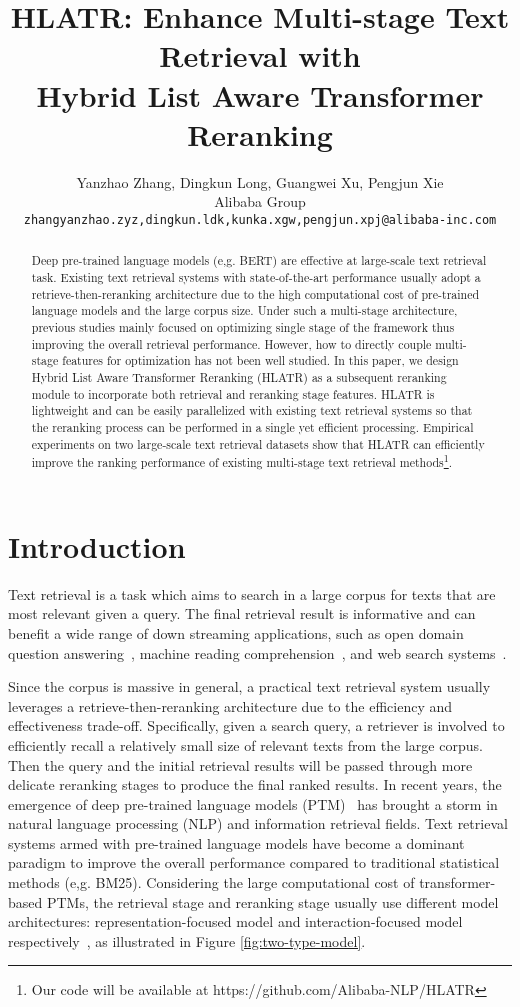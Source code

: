 \documentclass[11pt]{article}
\title{HLATR: Enhance Multi-stage Text Retrieval with \\ Hybrid List Aware Transformer Reranking}
\author{Yanzhao Zhang, Dingkun Long, Guangwei Xu, Pengjun Xie \\
  Alibaba Group \\
  \texttt{zhangyanzhao.zyz,dingkun.ldk,kunka.xgw,pengjun.xpj@alibaba-inc.com} \\
}
\begin{document}
\maketitle
\begin{abstract}
Deep pre-trained language models (e,g. BERT) are effective at large-scale text retrieval task. Existing text retrieval systems with state-of-the-art performance usually adopt a retrieve-then-reranking architecture due to the high computational cost of pre-trained language models and the large corpus size. Under such a multi-stage architecture, previous studies mainly focused on optimizing single stage of the framework thus improving the overall retrieval performance. However, how to directly couple multi-stage features for optimization has not been well studied. In this paper, we design Hybrid List Aware Transformer Reranking (HLATR) as a subsequent reranking module to incorporate both retrieval and reranking stage features. HLATR is lightweight and can be easily parallelized with existing text retrieval systems so that the reranking process can be performed in a single yet efficient processing. Empirical experiments on two large-scale text retrieval datasets show that HLATR can efficiently improve the ranking performance of existing multi-stage text retrieval methods\footnote{Our code will be available at https://github.com/Alibaba-NLP/HLATR}.
\end{abstract}

\section{Introduction}
Text retrieval is a task which aims to search in a large corpus for texts that are most relevant given a query. The final retrieval result is informative and can benefit a wide range of down streaming applications, such as open domain question answering~\cite{karpukhin2020dense,Li2021EncoderAO}, machine reading comprehension~\cite{Rajpurkar2016SQuAD1Q,Nishida2018RetrieveandReadML}, and web search systems~\cite{huang2020embedding,liu2021pre}.

Since the corpus is massive in general, a practical text retrieval system usually leverages a retrieve-then-reranking architecture due to the efficiency and effectiveness trade-off. Specifically, given a search query, a retriever is involved to efficiently recall a relatively small size of relevant texts from the large corpus. Then the query and the initial retrieval results will be passed through more delicate reranking stages to produce the final ranked results. In recent years, the emergence of deep pre-trained language models (PTM)~\cite{kenton2019bert,liu2019roberta} has brought a storm in natural language processing (NLP) and information retrieval fields. Text retrieval systems armed with pre-trained language models have become a dominant paradigm to improve the overall performance compared to traditional statistical methods (e,g. BM25). Considering the large computational cost of transformer-based PTMs, the retrieval stage and reranking stage usually use different model architectures: representation-focused model and interaction-focused model respectively~\cite{fan2021pre}, as illustrated in Figure \ref{fig:two-type-model}.
\end{document}
